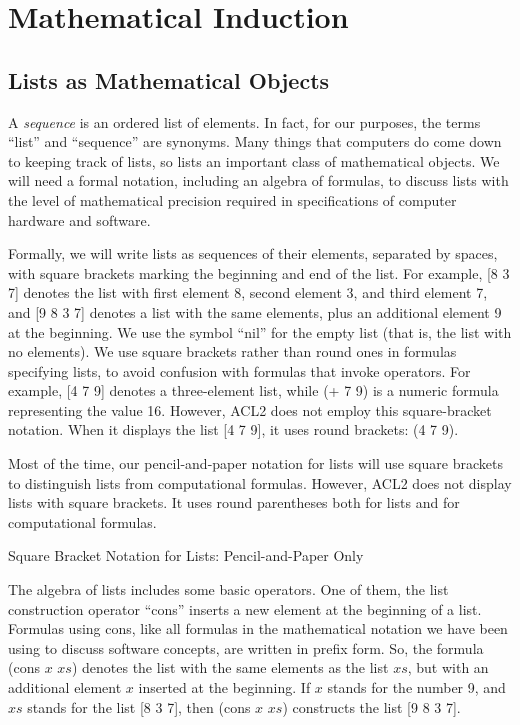 \chapter{Mathematical Induction}
\label{ch:mathematical-induction}

\section{Lists as Mathematical Objects}
\label{sec:lists-as-obj}
A \emph{sequence} is an ordered list of elements.
In fact, for our purposes, the terms ``list'' and ``sequence'' are synonyms.
Many things that computers do come down to keeping track of lists,
so lists an important class of mathematical objects.
We will need a formal notation, including an algebra of formulas,
to discuss lists with the level of mathematical precision
required in specifications of computer hardware and software.

Formally, we will write lists as sequences of their elements, separated by spaces,
with square brackets marking the beginning and end of the list.
For example, [8 3 7] denotes the list with first element 8,
second element 3, and third element 7, and
[9 8 3 7] denotes a list with the same elements,
plus an additional element 9 at the beginning.
\label{nil-def}
We use the symbol ``nil'' for the empty list
(that is, the list with no elements).
\label{square-brackets}
We use square brackets rather than round ones in formulas
specifying lists, to avoid confusion with formulas that invoke operators.
For example, [4 7 9] denotes a three-element list,
while (+ 7 9) is a numeric formula representing the value 16.
However, ACL2 does not employ this square-bracket notation.
When it displays the list [4 7 9],
it uses round brackets: (4 7 9).

\begin{aside}
Most of the time, our pencil-and-paper notation for lists
will use square brackets to distinguish lists from computational formulas.
However, ACL2 does not display lists with square brackets.
It uses round parentheses both for lists and for computational formulas.
\caption{Square Bracket Notation for Lists: Pencil-and-Paper Only}
\label{square-bracket-notation}
\end{aside}

The algebra of lists includes some basic operators.
One of them, the list construction operator ``cons''
inserts a new element at the beginning of a list.
Formulas using cons, like all formulas in
the mathematical notation we have been using to discuss software concepts,
are written in prefix form.
So, the formula (cons $x$ $xs$) denotes the list
with the same elements as the list $xs$,
but with an additional element $x$ inserted at the beginning.
If $x$ stands for the number 9,
and $xs$ stands for the list [8 3 7],
then (cons $x$ $xs$) constructs the list [9 8 3 7].

